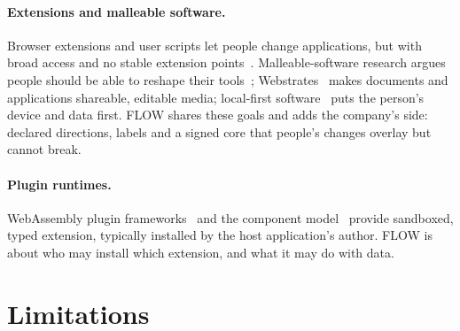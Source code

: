 \documentclass[10pt,twocolumn]{article}
\begin{document}
\paragraph{Extensions and malleable software.} Browser extensions and user scripts let people change
applications, but with broad access and no stable extension points~\cite{kapravelos2014hulk}.
Malleable-software research argues people should be able to reshape their tools~\cite{litt2025malleable};
Webstrates~\cite{klokmose2015webstrates} makes documents and applications shareable, editable media;
local-first software~\cite{kleppmann2019localfirst} puts the person's device and data first. FLOW
shares these goals and adds the company's side: declared directions, labels and a signed core that
people's changes overlay but cannot break.

\paragraph{Plugin runtimes.} WebAssembly plugin frameworks~\cite{extism} and the component
model~\cite{componentmodel} provide sandboxed, typed extension, typically installed by the host
application's author. FLOW is about who may install which extension, and what it may do with data.

\section{Limitations}
\label{sec:limits}
\end{document}
